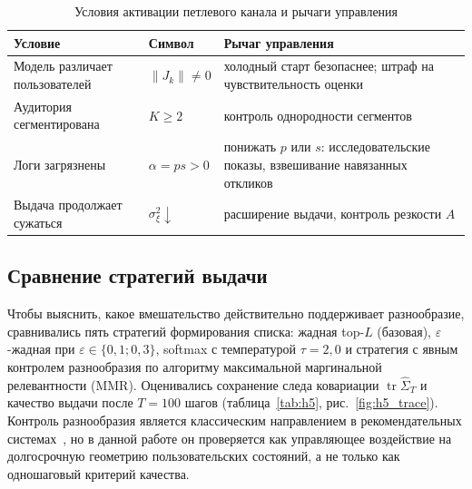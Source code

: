 \begin{table}[H]
    \caption{Условия активации петлевого канала и рычаги управления}
    \label{tab:checklist}
    \centering
    \begin{tabular}{p{4.2cm}p{2.4cm}p{6.2cm}}
        \toprule
        Условие & Символ & Рычаг управления \\
        \midrule
        Модель различает пользователей & $\lVert J_k\rVert\neq0$ &
        холодный старт безопаснее; штраф на чувствительность оценки \\
        Аудитория сегментирована & $K\ge2$ &
        контроль однородности сегментов \\
        Логи загрязнены & $\alpha=ps>0$ &
        понижать $p$ или $s$: исследовательские показы, взвешивание навязанных
        откликов \\
        Выдача продолжает сужаться & $\sigma_\xi^2\!\downarrow$ &
        расширение выдачи, контроль резкости $A$ \\
        \bottomrule
    \end{tabular}
\end{table}

\subsection{Сравнение стратегий выдачи}
\label{subsec:interventions}

Чтобы выяснить, какое вмешательство действительно поддерживает разнообразие,
сравнивались пять стратегий формирования списка: жадная top-$L$ (базовая),
$\varepsilon$-жадная при $\varepsilon\in\{0{,}1;0{,}3\}$, softmax с температурой
$\tau=2{,}0$ и стратегия с явным контролем разнообразия по алгоритму максимальной
маргинальной релевантности (MMR). Оценивались сохранение следа ковариации
$\operatorname{tr}\hat\Sigma_T$ и качество выдачи после $T=100$ шагов
(таблица~\ref{tab:h5}, рис.~\ref{fig:h5_trace}). Контроль разнообразия является
классическим направлением в рекомендательных системах~\cite{adomavicius2005}, но
в данной работе он проверяется как управляющее воздействие на долгосрочную
геометрию пользовательских состояний, а не только как одношаговый критерий
качества.

